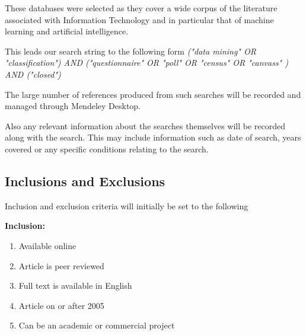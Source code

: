 These databases were selected as they cover a wide corpus of the literature associated with Information Technology and in particular that of machine learning and artificial intelligence.



This leads our search string to the following form \textit{("data mining" OR "classification")
  AND ("questionnaire" OR "poll" OR "census"  OR "canvass" )
  AND ("closed") }

The large number of references produced from such searches will be recorded and managed through Mendeley Desktop.

Also any relevant information about the searches themselves will be recorded along with the search. This may include information such as date of search, years covered or any specific conditions relating to the search.

\subsection{Inclusions and Exclusions}

\noindent
Inclusion and exclusion criteria will initially be set to the following

\noindent
\textbf{Inclusion:}
\begin{enumerate}
  \item Available online
  \item Article is peer reviewed
  \item Full text is available in English
  \item Article on or after 2005
  \item Can be an academic or commercial project
\end{enumerate}

